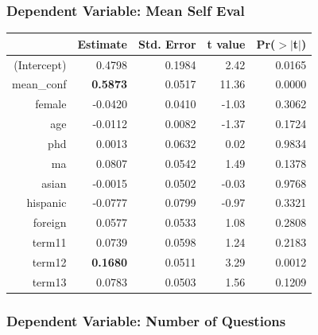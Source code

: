 \documentclass[11pt]{article} %
\begin{document}
\subsubsection{Dependent Variable: Mean Self Eval}

\begin{table}[H]
\centering
% 
\begin{tabular}{rrrrr}
  \hline
 & Estimate & Std. Error & t value & Pr($>$$|$t$|$) \\ 
  \hline
(Intercept) & 0.4798 & 0.1984 & 2.42 & 0.0165 \\ 
  mean\_conf & \textbf{0.5873} & 0.0517 & 11.36 & 0.0000 \\ 
  female & -0.0420 & 0.0410 & -1.03 & 0.3062 \\ 
  age & -0.0112 & 0.0082 & -1.37 & 0.1724 \\ 
  phd & 0.0013 & 0.0632 & 0.02 & 0.9834 \\ 
  ma & 0.0807 & 0.0542 & 1.49 & 0.1378 \\ 
  asian & -0.0015 & 0.0502 & -0.03 & 0.9768 \\ 
  hispanic & -0.0777 & 0.0799 & -0.97 & 0.3321 \\ 
  foreign & 0.0577 & 0.0533 & 1.08 & 0.2808 \\ 
  term11 & 0.0739 & 0.0598 & 1.24 & 0.2183 \\ 
  term12 & \textbf{0.1680} & 0.0511 & 3.29 & 0.0012 \\ 
  term13 & 0.0783 & 0.0503 & 1.56 & 0.1209 \\ 
   \hline
\end{tabular}
\end{table}


\subsubsection{Dependent Variable: Number of Questions}
\end{document}
